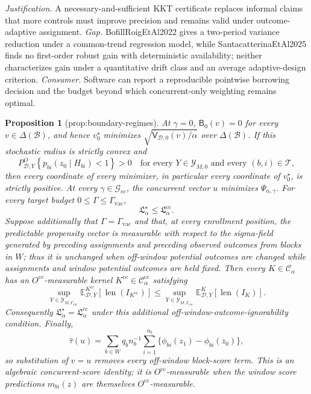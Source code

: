 \documentclass{article}
\newtheorem{proposition}{Proposition}
\begin{document}
\par\smallskip\noindent \textit{Justification.} A necessary-and-sufficient KKT certificate replaces informal claims that more controls must improve precision and remains valid under outcome-adaptive assignment. \textit{Gap.} BofillRoigEtAl2022 gives a two-period variance reduction under a common-trend regression model, while SantacatterinaEtAl2025 finds no first-order robust gain with deterministic availability; neither characterizes gain under a quantitative drift class and an average adaptive-design criterion. \textit{Consumer.} Software can report a reproducible pointwise borrowing decision and the budget beyond which concurrent-only weighting remains optimal.

\begin{proposition}[prop:boundary-regimes]\label{prop:boundary-regimes}
At \(\gamma=0\), \(\mathsf B_0(v)=0\) for every \(v\in\Delta(\mathcal B)\), and hence \(v_0^\star\) minimizes \(\sqrt{\overline{\mathsf V}_{\mathcal D,0}(v)/\alpha}\) over \(\Delta(\mathcal B)\).  If this stochastic radius is strictly convex and
\[
 P^O_{\mathcal D,Y}\!\left\{p_{bi}(z_0\mid H_{bi})<1\right\}>0
 \quad\text{for every }Y\in\mathcal Y_{M,0}\text{ and every }(b,i)\in\mathcal T,
\]
then every coordinate of every minimizer, in particular every coordinate of \(v_0^\star\), is strictly positive.  At every \(\gamma\in\mathcal G_{\mathrm{cc}}\), the concurrent vector \(u\) minimizes \(\Psi_{\alpha,\gamma}\).  For every target budget \(0\le\Gamma\le\Gamma_{\mathrm{vac}}\),
\[
 \mathfrak L_\alpha^\star\le\mathfrak L_\alpha^{\mathrm{cc}}.
\]
Suppose additionally that \(\Gamma=\Gamma_{\mathrm{vac}}\) and that, at every enrollment position, the predictable propensity vector is measurable with respect to the sigma-field generated by preceding assignments and preceding observed outcomes from blocks in \(W\); thus it is unchanged when off-window potential outcomes are changed while assignments and window potential outcomes are held fixed.  Then every \(K\in\mathcal C_\alpha\) has an \(O^{\mathrm{cc}}\)-measurable kernel \(K^{\mathrm{cc}}\in\mathcal C_\alpha^{\mathrm{cc}}\) satisfying
\[
 \sup_{Y\in\mathcal Y_{M,\Gamma_{\mathrm{vac}}}}
 \mathbb E^{K^{\mathrm{cc}}}_{\mathcal D,Y}[\operatorname{len}(I_{K^{\mathrm{cc}}})]
 \le
 \sup_{Y\in\mathcal Y_{M,\Gamma_{\mathrm{vac}}}}
 \mathbb E^K_{\mathcal D,Y}[\operatorname{len}(I_K)].
\]
Consequently \(\mathfrak L_\alpha^\star=\mathfrak L_\alpha^{\mathrm{cc}}\) under this additional off-window-outcome-ignorability condition.  Finally,
\[
 \widehat\tau(u)=
 \sum_{b\in W}q_b n_b^{-1}\sum_{i=1}^{n_b}
 \{\phi_{bi}(z_1)-\phi_{bi}(z_0)\},
\]
so substitution of \(v=u\) removes every off-window block-score term.  This is an algebraic concurrent-score identity; it is \(O^{\mathrm{cc}}\)-measurable when the window score predictions \(m_{bi}(z)\) are themselves \(O^{\mathrm{cc}}\)-measurable.
\end{proposition}
\end{document}
